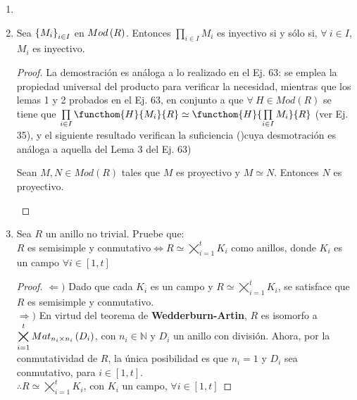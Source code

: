 \documentclass{article}
\begin{document}
\begin{enumerate}[label=\textbf{Ej \arabic*.}]
\begin{proof}
			$\boxed{\Leftarrow )}$ Suponga que $\ringmod{R}{R^{n}}{l} \simeq M \oplus K$. Entonces $M$ es f.g., y la sucesión en $Mod\lrprth{R}$
			se parte.\\
			$\therefore M$ es proyectivo y f.g.
		\end{proof}
		
		\item
		\item Sea ${\left\{{M}_{i}\right\}}_{i\in I}$ en $Mod\lrprth{R}$. Entonces $\prod\limits_{i\in I}M_i$ es inyectivo si y sólo si, $\forall\ i\in I$, $M_i$  es inyectivo.
		\begin{proof}
			La demostración es análoga a lo realizado en el Ej. 63: se emplea la propiedad universal del producto para verificar la necesidad, mientras que los lemas 1 y 2 probados en el Ej. 63, en conjunto a que $\forall\ H\in Mod(R)$ se tiene que $\prod\limits_{i\in I}\functhom{H}{M_i}{R}\simeq\functhom{H}{\prod\limits_{i\in I}M_i}{R}$ (ver Ej. 35), y el siguiente resultado  verifican la suficiencia ()cuya desmotración es análoga a aquella del Lema 3 del Ej. 63)
			\begin{lem}
				Sean $M,N\in Mod(R)$ tales que $M$ es proyectivo y $M\simeq N$. Entonces $N$ es proyectivo.
			\end{lem}
		\end{proof}
		\item Sea $R$ un anillo no trivial. Pruebe que:\\
		$R$ es semisimple y conmutativo$\Leftrightarrow R \simeq \displaystyle\bigtimes_{i=1}^{t} K_{i}$ como anillos, donde $K_{i}$ es un campo $\forall i \in [1,t]$
		\begin{proof}
			$\boxed{\Leftarrow )}$ Dado que cada $K_{i}$ es un campo y $R \simeq \displaystyle\bigtimes_{i=1}^{t} K_{i}$, se satisface que $R$ es semisimple y conmutativo.\\
			
			$\boxed{\Rightarrow )}$ En virtud del teorema de \textbf{Wedderburn-Artin}, $R$ es isomorfo a $\displaystyle\bigtimes_{i=1}^{t} Mat_{n_{i} \times n_{i}} \left(D_{i}\right)$, con $n_{i}\in\mathbb{N}$ y $D_{i}$ un anillo con división. Ahora, por la conmutatividad de $R$, la única posibilidad es que $n_{i}=1$ y $D_{i}$ sea conmutativo, para $i \in [1,t]$.\\
			$\therefore R \simeq \displaystyle\bigtimes_{i=1}^{t} K_{i}$, con $K_{i}$ un campo, $\forall i \in [1,t]$
		\end{proof}
	\end{enumerate}
\end{document}
